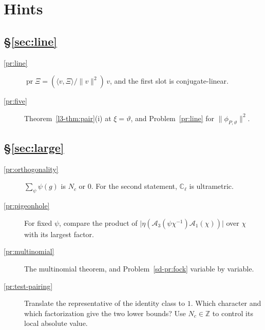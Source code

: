 \documentclass[reqno]{amsart}
\theoremstyle{definition}
\theoremstyle{plain}
\theoremstyle{remark}
\newcommand{\Z}{\mathbb{Z}}
\newcommand{\C}{\mathbb{C}}
\newcommand{\pr}{\operatorname{pr}}
\begin{document}
\section*{Hints}

\subsection*{\S\ref{sec:line}}
\begin{description}
\item[\ref{pr:line}] \(\pr\Xi = (\langle v,\Xi\rangle/\lVert v\rVert^2)\,v\), and the first slot is conjugate-linear.
\item[\ref{pr:five}] Theorem~\ref{l3-thm:pair}(i) at \(\xi = \vartheta\), and Problem~\ref{pr:line} for \(\lVert\phi_{P,\vartheta}\rVert^2\).
\end{description}

\subsection*{\S\ref{sec:large}}
\begin{description}
\item[\ref{pr:orthogonality}] \(\sum_\psi\psi(g)\) is \(N_c\) or \(0\).  For the second statement, \(\C_\ell\) is ultrametric.
\item[\ref{pr:pigeonhole}] For fixed \(\psi\), compare the product of \(\lvert\eta(\mathcal A_3(\psi\chi^{-1})\mathcal A_1(\chi))\rvert\) over \(\chi\) with its largest factor.
\item[\ref{pr:multinomial}] The multinomial theorem, and Problem~\ref{sd-pr:fock} variable by variable.
\item[\ref{pr:test-pairing}] Translate the representative of the identity class to \(1\).  Which character and which factorization give the two lower bounds?  Use \(N_c \in \Z\) to control its local absolute value.
\end{description}
\end{document}
